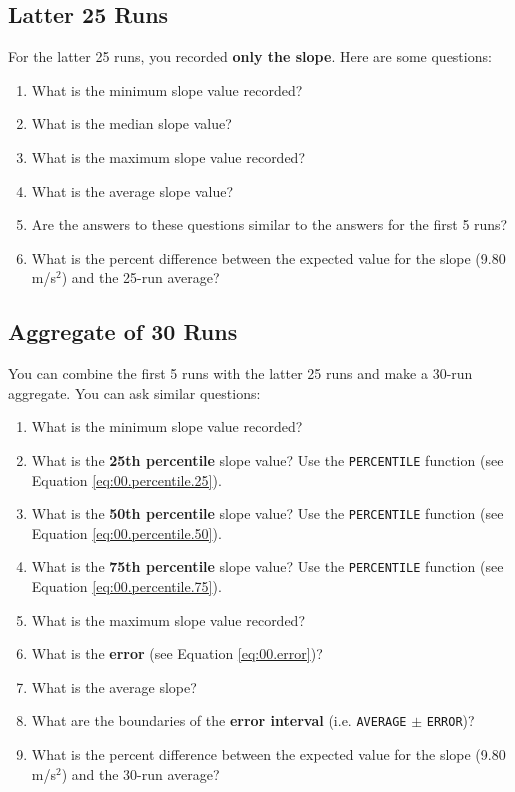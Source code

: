 \subsection{Latter 25 Runs} \label{sec:01.latter.25}
For the latter 25 runs, you recorded \textbf{only the slope}. Here are some questions:
\begin{enumerate}
    \item What is the minimum slope value recorded?
    \item What is the median slope value?
    \item What is the maximum slope value recorded?
    \item What is the average slope value?
    \item Are the answers to these questions similar to the answers for the first 5 runs?
    \item What is the percent difference between the expected value for the slope (9.80 m/s$^{2}$) and the 25-run average?
\end{enumerate}
\subsection{Aggregate of 30 Runs} \label{sec:01.all.30}
You can combine the first 5 runs with the latter 25 runs and make a 30-run aggregate. You can ask similar questions:
\begin{enumerate}
    \item What is the minimum slope value recorded?
    \item What is the \textbf{25th percentile} slope value? Use the \texttt{PERCENTILE} function (see Equation \ref{eq:00.percentile.25}).
    \item What is the \textbf{50th percentile} slope value? Use the \texttt{PERCENTILE} function (see Equation \ref{eq:00.percentile.50}).
    \item What is the \textbf{75th percentile} slope value? Use the \texttt{PERCENTILE} function (see Equation \ref{eq:00.percentile.75}).
    \item What is the maximum slope value recorded?
    \item What is the \textbf{error} (see Equation \ref{eq:00.error})?
    \item What is the average slope?
    \item What are the boundaries of the \textbf{error interval} (i.e. \texttt{AVERAGE} $\pm$ \texttt{ERROR})?
    \item What is the percent difference between the expected value for the slope (9.80 m/s$^{2}$) and the 30-run average?
\end{enumerate}
